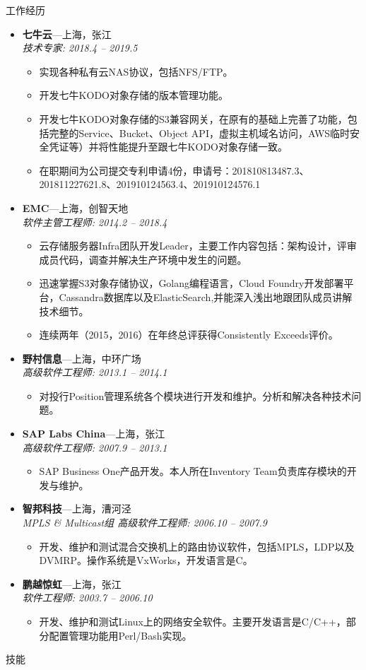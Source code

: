 \documentclass[11pt,oneside]{article}
\newenvironment{ressection}[1]{
	\vspace{4pt}
	{\selectfont\Large#1}
	\begin{itemize}
	\vspace{3pt}
}{
	\end{itemize}
}
\newcommand{\ressubitem}[1]{
	\vspace{-1pt}
	\item \begin{flushleft} #1 \end{flushleft}
}
\newcommand{\resbigitem}[3]{
	\vspace{-5pt}
	\item
	\textbf{#1}---#2 \\
	\textit{#3}
}
\newenvironment{ressubsec}[3]{
	\resbigitem{#1}{#2}{#3}
	\vspace{-2pt}
	\begin{itemize}
}{
    \end{itemize}
}
\begin{document}
\begin{CJK}{UTF8}{gkai}
\begin{ressection}{工作经历}
	\begin{ressubsec}{七牛云}{上海，张江}{技术专家: 2018.4 -- 2019.5}
		\ressubitem{实现各种私有云NAS协议，包括NFS/FTP。}
		\ressubitem{开发七牛KODO对象存储的版本管理功能。}
		\ressubitem{开发七牛KODO对象存储的S3兼容网关，在原有的基础上完善了功能，包括完整的Service、Bucket、Object API，虚拟主机域名访问，AWS临时安全凭证等）并将性能提升至跟七牛KODO对象存储一致。}
		\ressubitem{在职期间为公司提交专利申请4份，申请号：201810813487.3、201811227621.8、201910124563.4、201910124576.1}
	\end{ressubsec}

	\begin{ressubsec}{EMC}{上海，创智天地}{软件主管工程师: 2014.2 -- 2018.4}
		\ressubitem{云存储服务器Infra团队开发Leader，主要工作内容包括：架构设计，评审成员代码，调查并解决生产环境中发生的问题。}
		\ressubitem{迅速掌握S3对象存储协议，Golang编程语言，Cloud Foundry开发部署平台，Cassandra数据库以及ElasticSearch,并能深入浅出地跟团队成员讲解技术细节。}
		\ressubitem{连续两年（2015，2016）在年终总评获得Consistently Exceeds评价。}
	\end{ressubsec}

	\begin{ressubsec}{野村信息}{上海，中环广场}{高级软件工程师: 2013.1 -- 2014.1}
		\ressubitem{对投行Position管理系统各个模块进行开发和维护。分析和解决各种技术问题。}
	\end{ressubsec}

	\begin{ressubsec}{SAP Labs China}{上海，张江}{高级软件工程师: 2007.9 -- 2013.1}
		\ressubitem{SAP Business One产品开发。本人所在Inventory Team负责库存模块的开发与维护。}
	\end{ressubsec}

	\begin{ressubsec}{智邦科技}{上海，漕河泾}{MPLS \& Multicast组 高级软件工程师: 2006.10 -- 2007.9}
		\ressubitem{开发、维护和测试混合交换机上的路由协议软件，包括MPLS，LDP以及DVMRP。操作系统是VxWorks，开发语言是C。}
	\end{ressubsec}

	\begin{ressubsec}{鹏越惊虹}{上海，张江}{软件工程师: 2003.7 -- 2006.10}
		\ressubitem{开发、维护和测试Linux上的网络安全软件。主要开发语言是C/C++，部分配置管理功能用Perl/Bash实现。}
	\end{ressubsec}

\end{ressection}

\begin{ressection}{技能}


\end{ressection}
\end{CJK}
\end{document}
